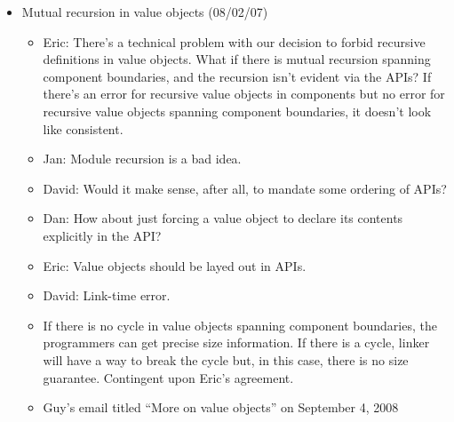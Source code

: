 \begin{itemize}
\item Mutual recursion in value objects (08/02/07)
 \begin{itemize}
\item Eric: There's a technical problem with our decision to forbid recursive definitions in value objects. What if there is mutual recursion spanning component boundaries, and the recursion isn't evident via the APIs? If there's an error for recursive value objects in components but no error for recursive value objects spanning component boundaries, it doesn't look like consistent.
\item Jan: Module recursion is a bad idea.
\item David: Would it make sense, after all, to mandate some ordering of APIs?
\item Dan: How about just forcing a value object to declare its contents explicitly in the API?
\item Eric: Value objects should be layed out in APIs.
\item David: Link-time error.
\item If there is no cycle in value objects spanning component boundaries, the programmers can get precise size information. If there is a cycle, linker will have a way to break the cycle but, in this case, there is no size guarantee.
Contingent upon Eric's agreement.
\item Guy's email titled ``More on value objects'' on September 4, 2008
 \end{itemize}
 \end{itemize}

